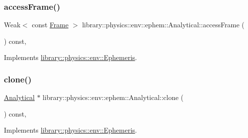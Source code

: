 \subsubsection{\texorpdfstring{access\+Frame()}{accessFrame()}}
{\footnotesize\ttfamily Weak$<$ const \hyperlink{classlibrary_1_1physics_1_1coord_1_1_frame}{Frame} $>$ library\+::physics\+::env\+::ephem\+::\+Analytical\+::access\+Frame (\begin{DoxyParamCaption}{ }\end{DoxyParamCaption}) const\hspace{0.3cm}{\ttfamily [override]}, {\ttfamily [virtual]}}



Implements \hyperlink{classlibrary_1_1physics_1_1env_1_1_ephemeris_a62109772f7673764f31a496ec9a52a27}{library\+::physics\+::env\+::\+Ephemeris}.

\mbox{\label{classlibrary_1_1physics_1_1env_1_1ephem_1_1_analytical_acd51ca99177b1433b6623829ae003bec}} 
\subsubsection{\texorpdfstring{clone()}{clone()}}
{\footnotesize\ttfamily \hyperlink{classlibrary_1_1physics_1_1env_1_1ephem_1_1_analytical}{Analytical} $\ast$ library\+::physics\+::env\+::ephem\+::\+Analytical\+::clone (\begin{DoxyParamCaption}{ }\end{DoxyParamCaption}) const\hspace{0.3cm}{\ttfamily [override]}, {\ttfamily [virtual]}}



Implements \hyperlink{classlibrary_1_1physics_1_1env_1_1_ephemeris_a7ddecd88d91f79ff204100eb9607b591}{library\+::physics\+::env\+::\+Ephemeris}.

\mbox{\label{classlibrary_1_1physics_1_1env_1_1ephem_1_1_analytical_a0c0fe5d8326ba439bb0b51e7536ab0fd}} 
